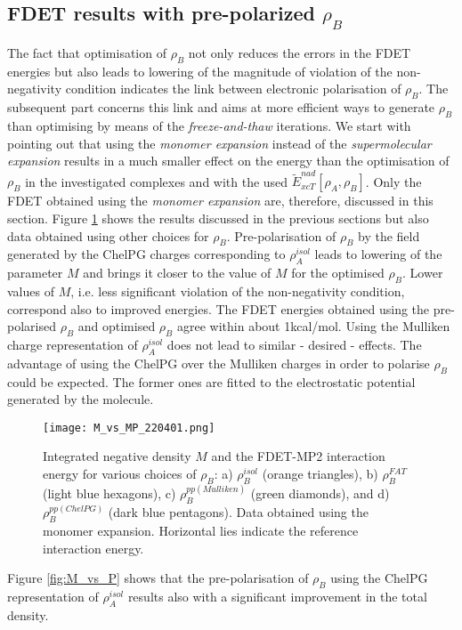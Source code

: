 \documentclass[journal=jctcce,manuscript=article]{achemso}
\begin{document}
\subsection{FDET results with pre-polarized  $\rho_B$}

The fact that optimisation of $\rho_B$ not only reduces the errors in the FDET energies but also leads to lowering of the magnitude of violation of the non-negativity condition indicates the link between electronic polarisation of 
$\rho_B$. 
The subsequent part concerns this link and aims at more efficient ways to generate $\rho_B$ than optimising by means of the  {\it freeze-and-thaw} iterations.  
We start with pointing out that using the  {\it monomer expansion} instead of the {\it supermolecular expansion} results in a much smaller effect on the energy than the optimisation of $\rho_B$ in the investigated complexes and with the used $\tilde{E}_{xcT}^{nad}[\rho_A,\rho_B]$. 
Only the  FDET  obtained using the {\it monomer expansion} are, therefore, discussed in this section.
Figure \ref{fig:M_vs_MP} 
shows the results discussed in the previous sections but also data obtained using other choices  for $\rho_B$.
Pre-polarisation of $\rho_B$ by the field generated by the ChelPG charges corresponding to $\rho_A^{isol}$ leads to lowering of the parameter $M$ and brings it closer to the value of $M$ for the optimised $\rho_B$. 
Lower values of $M$, i.e. less significant violation of the non-negativity condition, correspond also to improved energies. 
The FDET energies obtained using the pre-polarised $\rho_B$ and optimised $\rho_B$ agree within about 1kcal/mol.
Using the  Mulliken charge representation of $\rho_A^{isol}$ does not lead to similar - desired - effects. 
The advantage of using the ChelPG  over the Mulliken charges  in order to polarise $\rho_B$ could be expected.  The former ones are fitted to the electrostatic potential generated by the molecule.
\begin{figure}[H]
\centering
\texttt{[image: M\_vs\_MP\_220401.png]}
\caption{Integrated negative density $M$ and the FDET-MP2 interaction energy for various choices of $\rho_B$:  a) $\rho_B^{isol}$ (orange triangles), b) $\rho_B^{FAT}$ (light blue hexagons), c) $\rho_B^{pp(Mulliken)}$ (green diamonds), and d) $\rho_B^{pp(ChelPG)}$ (dark blue pentagons). Data obtained using the monomer expansion. Horizontal lies indicate the reference interaction energy.}
\label{fig:M_vs_MP}
\end{figure}

Figure \ref{fig:M_vs_P} shows that the pre-polarisation of $\rho_B$ using the  ChelPG representation of $\rho_A^{isol}$
results also with a significant improvement in the total density.
\end{document}
